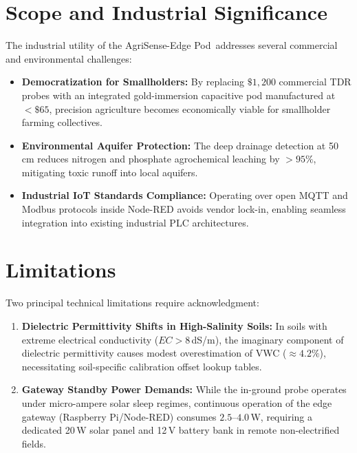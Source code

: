 \documentclass[journal,10pt,twocolumn]{IEEEtran}
\begin{document}
\section{Scope and Industrial Significance}
The industrial utility of the AgriSense-Edge Pod\texttrademark\ addresses several commercial and environmental challenges:
\begin{itemize}
    \item \textbf{Democratization for Smallholders:} By replacing $\$1,200$ commercial TDR probes with an integrated gold-immersion capacitive pod manufactured at $<\$65$, precision agriculture becomes economically viable for smallholder farming collectives.
    \item \textbf{Environmental Aquifer Protection:} The deep drainage detection at 50\,cm reduces nitrogen and phosphate agrochemical leaching by $>95\%$, mitigating toxic runoff into local aquifers.
    \item \textbf{Industrial IoT Standards Compliance:} Operating over open MQTT and Modbus protocols inside Node-RED avoids vendor lock-in, enabling seamless integration into existing industrial PLC architectures.
\end{itemize}

\section{Limitations}
Two principal technical limitations require acknowledgment:
\begin{enumerate}
    \item \textbf{Dielectric Permittivity Shifts in High-Salinity Soils:} In soils with extreme electrical conductivity ($EC > 8$\,dS/m), the imaginary component of dielectric permittivity causes modest overestimation of VWC ($\approx 4.2\%$), necessitating soil-specific calibration offset lookup tables.
    \item \textbf{Gateway Standby Power Demands:} While the in-ground probe operates under micro-ampere solar sleep regimes, continuous operation of the edge gateway (Raspberry Pi/Node-RED) consumes $2.5$--$4.0$\,W, requiring a dedicated 20\,W solar panel and 12\,V battery bank in remote non-electrified fields.
\end{enumerate}
\end{document}
